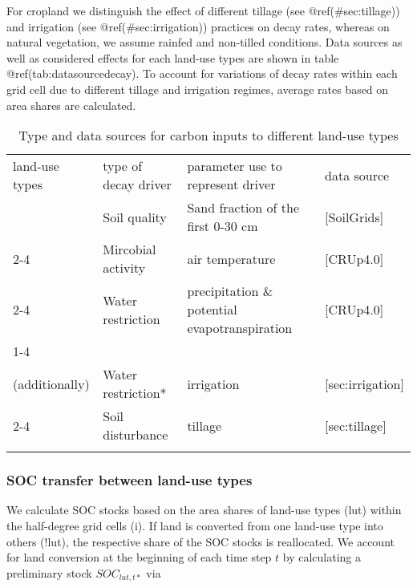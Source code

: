 \documentclass[gc, manuscript]{copernicus}
\begin{document}
For cropland we distinguish the effect of different tillage (see
@ref(\#sec:tillage)) and irrigation (see @ref(\#sec:irrigation))
practices on decay rates, whereas on natural vegetation, we assume
rainfed and non-tilled conditions. Data sources as well as considered
effects for each land-use types are shown in table
@ref(tab:datasourcedecay). To account for variations of decay rates
within each grid cell due to different tillage and irrigation regimes,
average rates based on area shares are calculated.

 \begin{table*}[h]
 \caption{Type and data sources for carbon inputs to different land-use types}
 \begin{tabular}{l l l l}
 \tophline
  land-use types   & type of decay driver & parameter use to represent driver & data source \\
 \middlehline
 \multirow{2}{*}{all} & Soil quality & Sand fraction of the first 0-30 cm &  [SoilGrids]  \\
                      \cline{2-4}
                      
                      & Mircobial activity & air temperature & [CRUp4.0] \\
                      \cline{2-4}
                      
                      & Water restriction & precipitation \& potential evapotranspiration & [CRUp4.0] \\
                      \cline{1-4}
\multirow{2}{*}{\begin{minipage}[t]{0.2\columnwidth}\raggedright\strut Cropland\\(additionally)\strut\end{minipage}} & Water restriction*  & irrigation  & [sec:irrigation] \\ 
                      \cline{2-4}
                      
                      & Soil disturbance & tillage & [sec:tillage] \\
 \bottomhline
 \end{tabular}
 \label{tab:datasourcedecay}
 \belowtable{}
 \end{table*}

\subsubsection{SOC transfer between land-use types}

We calculate SOC stocks based on the area shares of land-use types (lut)
within the half-degree grid cells (i). If land is converted from one
land-use type into others (!lut), the respective share of the SOC stocks
is reallocated. We account for land conversion at the beginning of each
time step \(t\) by calculating a preliminary stock \(SOC_{lut,t*}\) via
\end{document}
